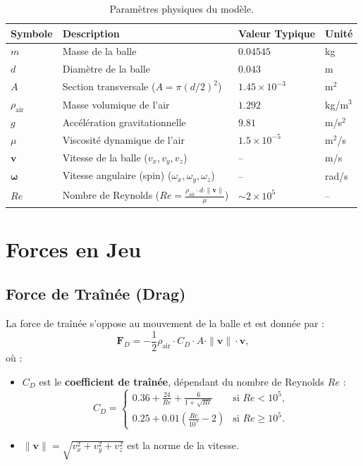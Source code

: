 \documentclass[11pt, a4paper]{article}
\newcommand{\vb}[1]{\mathbf{#1}}       %
\begin{document}
\begin{table}[h]
\centering
\caption{Paramètres physiques du modèle.}
\label{tab:parameters}
\begin{tabular}{llll}
\toprule
\textbf{Symbole} & \textbf{Description} & \textbf{Valeur Typique} & \textbf{Unité} \\
\midrule
$m$               & Masse de la balle & $0.04545$ & kg \\
$d$               & Diamètre de la balle & $0.043$ & m \\
$A$               & Section transversale ($A = \pi (d/2)^2$) & $1.45 \times 10^{-3}$ & m$^2$ \\
$\rho_\text{air}$ & Masse volumique de l'air & $1.292$ & kg/m$^3$ \\
$g$               & Accélération gravitationnelle & $9.81$ & m/s$^2$ \\
$\mu$              & Viscosité dynamique de l'air & $1.5 \times 10^{-5}$ & m$^2$/s \\
$\vb{v}$          & Vitesse de la balle ($v_x, v_y, v_z$) & -- & m/s \\
$\vb{\omega}$     & Vitesse angulaire (spin) ($\omega_x, \omega_y, \omega_z$) & -- & rad/s \\
$Re$              & Nombre de Reynolds ($Re = \frac{\rho_\text{air} \cdot d \cdot \|\vb{v}\|}{\mu}$) & $\sim 2 \times 10^5$ & -- \\
\bottomrule
\end{tabular}
\end{table}



\section{Forces en Jeu}
\label{sec:forces}

\subsection{Force de Traînée (Drag)}
La force de traînée s'oppose au mouvement de la balle et est donnée par :
\begin{equation}
    \vb{F}_D = -\frac{1}{2} \rho_\text{air} \cdot C_D \cdot A \cdot \|\vb{v}\| \cdot \vb{v},
\end{equation}
où :
\begin{itemize}
    \item $C_D$ est le \textbf{coefficient de traînée}, dépendant du nombre de Reynolds $Re$ :
    \begin{equation}
        C_D =
        \begin{cases}
            0.36 + \frac{24}{Re} + \frac{6}{1 + \sqrt{Re}} & \text{si } Re < 10^5, \\
            0.25 + 0.01 \left( \frac{Re}{10^5} - 2 \right) & \text{si } Re \geq 10^5.
        \end{cases}
    \end{equation}
    \item $\|\vb{v}\| = \sqrt{v_x^2 + v_y^2 + v_z^2}$ est la norme de la vitesse.
\end{itemize}
\end{document}
